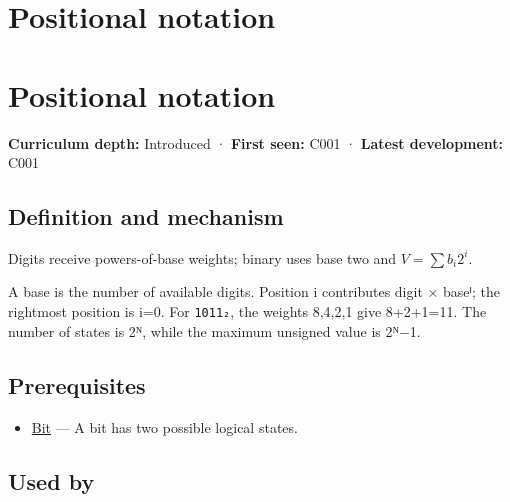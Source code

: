 \hypertarget{appendix-83c3f28f7bda}{}
\section*{Positional notation}
\section{Positional notation}\label{appendix-83c3f28f7bda-positional-notation}

\textbf{Curriculum depth:} Introduced · \textbf{First seen:} C001 · \textbf{Latest development:} C001

\subsection{Definition and mechanism}\label{appendix-83c3f28f7bda-definition-and-mechanism}

Digits receive powers-of-base weights; binary uses base two and \(V=\sum b_i2^i\).

A base is the number of available digits. Position i contributes digit × baseⁱ; the rightmost position is i=0. For \texttt{1011₂}, the weights 8,4,2,1 give 8+2+1=11. The number of states is 2ᴺ, while the maximum unsigned value is 2ᴺ−1.

\subsection{Prerequisites}\label{appendix-83c3f28f7bda-prerequisites}

\begin{itemize}
\tightlist
\item
  \hyperref[appendix-ddbb69998a2e]{Bit} --- A bit has two possible logical states.
\end{itemize}

\subsection{Used by}\label{appendix-83c3f28f7bda-used-by}


